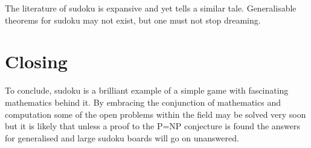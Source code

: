 \documentclass[a4paper,11pt]{report}
\begin{document}
The literature of sudoku is expansive and yet tells a similar tale. Generalisable theorems for sudoku may not exist, but one must not stop dreaming.
\section{Closing}

To conclude, sudoku is a brilliant example of a simple game with fascinating mathematics behind it. By embracing the conjunction of mathematics and computation some of the open problems within the field may be solved very soon but it is likely that unless a proof to the P=NP conjecture is found the answers for generalised and large sudoku boards will go on unanswered.




\end{document}
